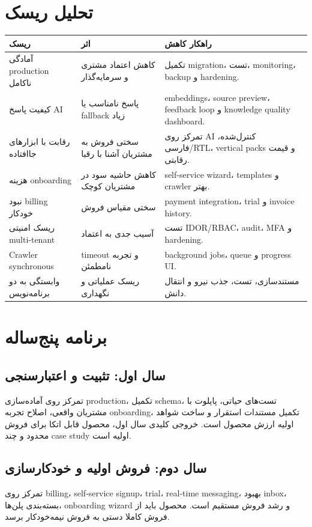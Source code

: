 \documentclass[12pt,a4paper]{article}
\begin{document}
\section{تحلیل ریسک}
\begin{longtable}{R{42mm} R{68mm} R{44mm}}
\toprule
\textbf{ریسک} & \textbf{اثر} & \textbf{راهکار کاهش} \\
\midrule
\endhead
آمادگی production ناکامل & کاهش اعتماد مشتری و سرمایه‌گذار & تکمیل migration، تست، monitoring، backup و hardening. \\
کیفیت پاسخ AI & پاسخ نامناسب یا fallback زیاد & embeddings، source preview، feedback loop و knowledge quality dashboard. \\
رقابت با ابزارهای جاافتاده & سختی فروش به مشتریان آشنا با رقبا & تمرکز روی AI کنترل‌شده، فارسی/RTL، vertical packs و قیمت رقابتی. \\
هزینه onboarding & کاهش حاشیه سود در مشتریان کوچک & self-service wizard، templates و crawler بهتر. \\
نبود billing خودکار & سختی مقیاس فروش & payment integration، trial و invoice history. \\
ریسک امنیتی multi-tenant & آسیب جدی به اعتماد & تست IDOR/RBAC، audit، MFA و hardening. \\
Crawler synchronous & timeout و تجربه نامطمئن & background jobs، queue و progress UI. \\
وابستگی به دو برنامه‌نویس & ریسک عملیاتی و نگهداری & مستندسازی، تست، جذب نیرو و انتقال دانش. \\
\bottomrule
\end{longtable}

\section{برنامه پنج‌ساله}
\subsection{سال اول: تثبیت و اعتبارسنجی}
تمرکز روی آماده‌سازی production، تکمیل schema، تست‌های حیاتی، پایلوت با مشتریان واقعی، اصلاح تجربه onboarding، تکمیل مستندات استقرار و ساخت شواهد اولیه ارزش محصول است. خروجی کلیدی سال اول، محصول قابل اتکا برای فروش محدود و چند case study اولیه است.

\subsection{سال دوم: فروش اولیه و خودکارسازی}
تمرکز روی billing، self-service signup، trial، real-time messaging، بهبود inbox، بسته‌بندی پلن‌ها، onboarding wizard و رشد فروش مستقیم است. محصول باید از فروش کاملا دستی به فروش نیمه‌خودکار برسد.
\end{document}
